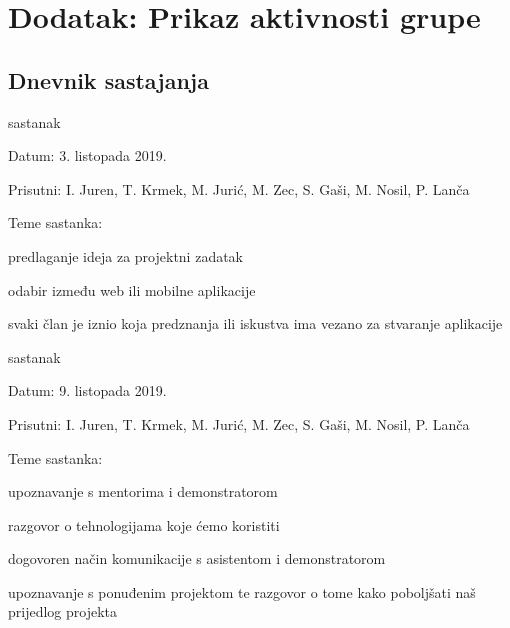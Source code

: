 \chapter*{Dodatak: Prikaz aktivnosti grupe}
		
		\section*{Dnevnik sastajanja}
		
		\begin{packed_enum}
			\item  sastanak
			
			\item[] \begin{packed_item}
				\item Datum: 3. listopada 2019.
				\item Prisutni: I. Juren, T. Krmek, M. Jurić, M. Zec, S. Gaši, M. Nosil, P. Lanča
				\item Teme sastanka:
				\begin{packed_item}
					\item  predlaganje ideja za projektni zadatak
					\item  odabir između web ili mobilne aplikacije
					\item  svaki član je iznio koja predznanja ili iskustva ima vezano za stvaranje aplikacije  
				\end{packed_item}
			\end{packed_item}
			
			\item  sastanak
			\item[] \begin{packed_item}
				\item Datum: 9. listopada 2019.
				\item Prisutni: I. Juren, T. Krmek, M. Jurić, M. Zec, S. Gaši, M. Nosil, P. Lanča
				\item Teme sastanka:
				\begin{packed_item}
					\item  upoznavanje s mentorima i demonstratorom
					\item  razgovor o tehnologijama koje ćemo koristiti
					\item  dogovoren način komunikacije s asistentom i demonstratorom
					\item  upoznavanje s ponuđenim projektom te razgovor o tome kako poboljšati naš prijedlog projekta
				\end{packed_item}
			\end{packed_item}
			

\end{packed_enum}
